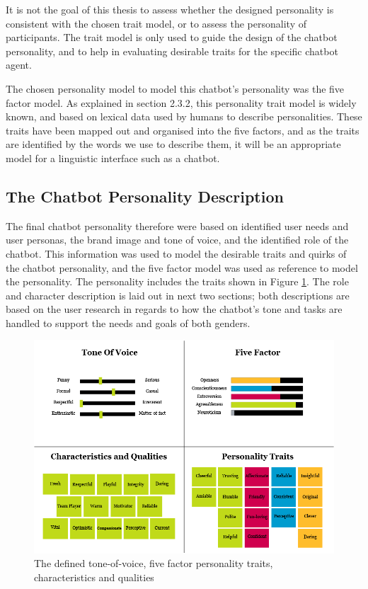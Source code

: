     It is not the goal of this thesis to assess whether the designed personality is consistent with the chosen trait model, or to assess the personality of participants. The trait model is only used to guide the design of the chatbot personality, and to help in evaluating desirable traits for the specific chatbot agent. 
    
    The chosen personality model to model this chatbot's personality was the five factor model. As explained in section 2.3.2, this personality trait model is widely known, and based on lexical data used by humans to describe personalities. These traits have been mapped out and organised into the five factors, and as the traits are identified by the words we use to describe them, it will be an appropriate model for a linguistic interface such as a chatbot.
    
\vspace{5mm}

    \subsection{The Chatbot Personality Description}
    The final chatbot personality therefore were based on identified user needs and user personas, the brand image and tone of voice, and the identified role of the chatbot. This information was used to model the desirable traits and quirks of the chatbot personality, and the five factor model was used as reference to model the personality. The personality includes the traits shown in Figure \ref{fig:characteristics}. The role and character description is laid out in next two sections; both descriptions are based on the user research in regards to how the chatbot's tone and tasks are handled to support the needs and goals of both genders.
    
    \begin{figure}[h]
            \centering
            \includegraphics[scale=0.5]{figures/Defined_characteristics_and_traits.png}
            \caption{The defined tone-of-voice, five factor personality traits, characteristics and qualities}
            \label{fig:characteristics}
        \end{figure}
    
